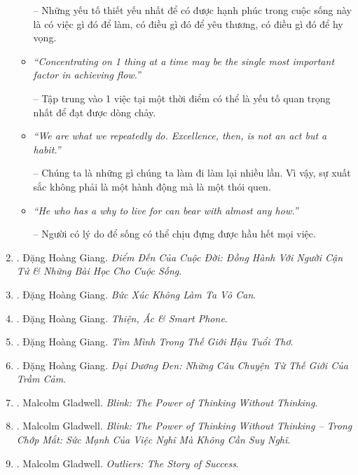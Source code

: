 \documentclass{article}
\begin{document}
\begin{enumerate}
\begin{itemize}
		-- Những yếu tố thiết yếu nhất để có được hạnh phúc trong cuộc sống này là có việc gì đó để làm, có điều gì đó để yêu thương, có điều gì đó để hy vọng.
		\item {\it``Concentrating on 1 thing at a time may be the single most important factor in achieving flow.''}
		
		-- Tập trung vào 1 việc tại một thời điểm có thể là yếu tố quan trọng nhất để đạt được dòng chảy.
		\item {\it``We are what we repeatedly do. Excellence, then, is not an act but a habit.''}
		
		-- Chúng ta là những gì chúng ta làm đi làm lại nhiều lần. Vì vậy, sự xuất sắc không phải là một hành động mà là một thói quen.
		\item {\it``He who has a why to live for can bear with almost any how.''}
		
		-- Người có lý do để sống có thể chịu đựng được hầu hết mọi việc.
	\end{itemize}	
	
	\item \cite{Giang_death}. {\sc Đặng Hoàng Giang}. {\it Điểm Đến Của Cuộc Đời: Đồng Hành Với Người Cận Tử \& Những Bài Học Cho Cuộc Sống}.\hfill{\sf[done]}
	
	\item \cite{Giang_buc_xuc}. {\sc Đặng Hoàng Giang}. {\it Bức Xúc Không Làm Ta Vô Can}.\hfill{\sf[done]}
	
	\item \cite{Giang_smartphone}. {\sc Đặng Hoàng Giang}. {\it Thiện, Ác \& Smart Phone}.\hfill{\sf[done]}
	
	\item \cite{Giang_after_childhood}. {\sc Đặng Hoàng Giang}. {\it Tìm Mình Trong Thế Giới Hậu Tuổi Thơ}.\hfill{\sf[done]}
	
	\item \cite{Giang_dai_duong_den}. {\sc Đặng Hoàng Giang}. {\it Đại Dương Đen: Những Câu Chuyện Từ Thế Giới Của Trầm Cảm}.\hfill{\sf[done]}
	
	\item \cite{Gladwell_blink}. {\sc Malcolm Gladwell}. {\it Blink: The Power of Thinking Without Thinking}.\hfill{\sf[reading]}
	
	\item \cite{Gladwell_blink_VN}. {\sc Malcolm Gladwell}. {\it Blink: The Power of Thinking Without Thinking -- Trong Chớp Mắt: Sức Mạnh Của Việc Nghĩ Mà Không Cần Suy Nghĩ}.\hfill{\sf[done]}
	
	\item \cite{Gladwell_outlier}. {\sc Malcolm Gladwell}. {\it Outliers: The Story of Success}.\hfill{\sf[reading]}
	

\end{enumerate}
\end{document}
